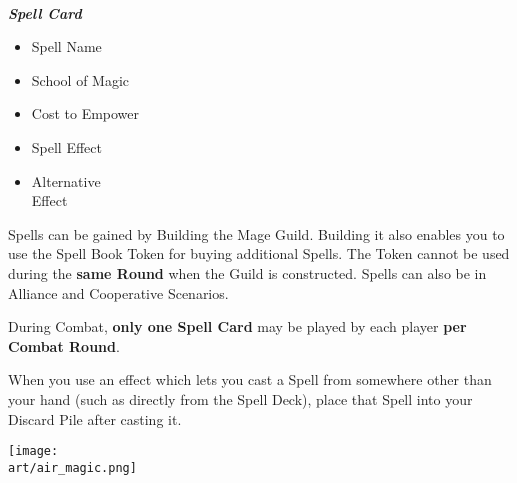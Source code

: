 \begin{multicols*}{2}
{
  \centering
  \\
  \medskip
  \footnotesize
  \textbf{\textit{\textcolor{darkcandyapplered}{Spell Card}}}\par

  \noindent
  \begin{minipage}[t]{0.5\linewidth}
    \begin{itemize}[itemsep=0pt, parsep=5pt, topsep=0pt, partopsep=0pt]
      \item[\textbf{1.}] Spell Name
      \item[\textbf{2.}] School of Magic
      \item[\textbf{3.}] Cost to Empower
    \end{itemize}
  \end{minipage}
  \begin{minipage}[t]{0.4\linewidth}
    \begin{itemize}[itemsep=0pt, parsep=5pt, topsep=0pt, partopsep=0pt]
      \item[\textbf{4.}] Spell Effect
      \item[\textbf{5.}] Alternative\\Effect
    \end{itemize}
  \end{minipage}
}
\medskip

Spells can be gained by Building the Mage Guild.
Building it also enables you to use the Spell Book Token for buying additional Spells.
The Token cannot be used during the \textbf{same Round} when the Guild is constructed. Spells can also be  in Alliance and Cooperative Scenarios.

During Combat, \textbf{only one Spell Card} may be played by each player \textbf{per Combat Round}.

\columnbreak
When you use an effect which lets you cast a Spell from somewhere other than your hand (such as directly from the Spell Deck), place that Spell into your Discard Pile after casting it.

\begin{center}
  \vspace*{\fill}
  {\texttt{[image: \\art/air\_magic.png]}}
  \vspace*{\fill}
\end{center}


\end{multicols*}
